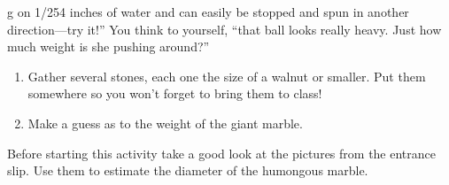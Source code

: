 g on 1/254 inches of water and can easily be stopped and spun in another direction---try it!'' You think to yourself, ``that ball looks really heavy. Just how much weight is she pushing around?''

\begin{enumerate}
    \item Gather several stones, each one the size of a walnut or smaller. Put them somewhere so you won't forget to bring them to class!\wbvfill
    \item Make a guess as to the weight of the giant marble.\wbvfill
\end{enumerate}

\wbnewpage
\noindent Before starting this activity take a good look at the pictures from the entrance slip. Use them to estimate the diameter of the humongous marble. 


